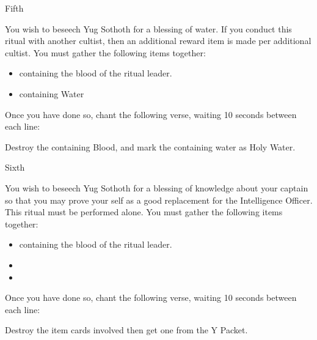 \documentclass[greennotebook]{guildcamp4} %
\begin{document}
\begin{page}{Fifth}
	
		You wish to beseech Yug Sothoth for a blessing of water. If you conduct this ritual with another cultist, then an additional reward item is made per additional cultist. You must gather the following items together: 
		
		\begin{itemize}
			\item \iTestTube{} containing the blood of the ritual leader.
			\item \iTestTube{} containing Water
		\end{itemize}
		
		Once you have done so, chant the following verse, waiting 10 seconds between each line:
		
		
		Destroy the \iTestTube{} containing Blood, and mark the \iTestTube{} containing water as Holy Water.
		
	
\end{page}

\begin{page}{Sixth}
	

	You wish to beseech Yug Sothoth for a blessing of knowledge about your captain so that you may prove your self as a good replacement for the Intelligence Officer. This ritual must be performed alone. You must gather the following items together:
		
	\begin{itemize}
			\item \iTestTube{} containing the blood of the ritual leader.
			\item \iGlassLens{}
			\item \iScrapMetal{}
	\end{itemize}
	
	Once you have done so, chant the following verse, waiting 10 seconds between each line:
		
	
	Destroy the item cards involved then get one \iBlackMailD{} from the Y Packet.
	
	
\end{page}


\endnotebook
\end{document}
